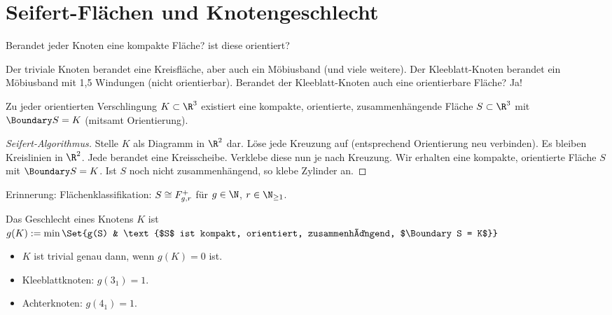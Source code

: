 \section{Seifert-Flächen und Knotengeschlecht}

Berandet jeder Knoten eine kompakte Fläche? ist diese orientiert?

Der triviale Knoten berandet eine Kreisfläche, aber auch ein Möbiusband (und viele weitere).
Der Kleeblatt-Knoten berandet ein Möbiusband mit 1,5 Windungen (nicht orientierbar).
Berandet der Kleeblatt-Knoten auch eine orientierbare Fläche? Ja!

\begin{st}
    Zu jeder orientierten Verschlingung $K \subset \R^3$ existiert eine kompakte, orientierte, zusammenhängende Fläche $S \subset \R^3$ mit $\Boundary S = K$ (mitsamt Orientierung).
    \begin{proof}[Seifert-Algorithmus]
        Stelle $K$ als Diagramm in $\R^2$ dar.
        Löse jede Kreuzung auf (entsprechend Orientierung neu verbinden).
        Es bleiben Kreislinien in $\R^2$.
        Jede berandet eine Kreisscheibe.
        Verklebe diese nun je nach Kreuzung.
        Wir erhalten eine kompakte, orientierte Fläche $S$ mit $\Boundary S = K$.
        Ist $S$ noch nicht zusammenhängend, so klebe Zylinder an.
    \end{proof}
\end{st}

Erinnerung: Flächenklassifikation:
\begin{math}
    S \cong F_{g,r}^+
\end{math}
für $g \in \N$, $r \in \N_{\ge 1}$.

\begin{df}
    Das Geschlecht eines Knotens $K$ ist
    \begin{math}
        g(K) := \min \Set{g(S) & \text{$S$ ist kompakt, orientiert, zusammenhängend, $\Boundary S = K$}}
    \end{math}
\end{df}

\begin{note}
    \begin{itemize}
        \item
            $K$ ist trivial genau dann, wenn $g(K) = 0$ ist.
        \item
            Kleeblattknoten: $g(3_1) = 1$.
        \item
            Achterknoten: $g(4_1) = 1$.
    \end{itemize}
\end{note}

